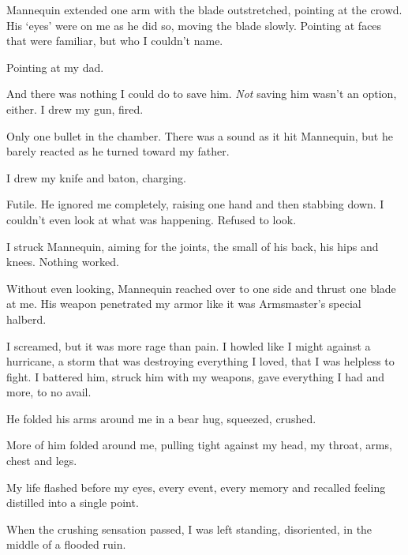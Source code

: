 Mannequin extended one arm with the blade outstretched, pointing at the crowd.  His `eyes' were on me as he did so, moving the blade slowly.  Pointing at faces that were familiar, but who I couldn't name.



Pointing at my dad.



And there was nothing I could do to save him.  \emph{Not} saving him wasn't an option, either.  I drew my gun, fired.



Only one bullet in the chamber.  There was a sound as it hit Mannequin, but he barely reacted as he turned toward my father.



I drew my knife and baton, charging.



Futile.  He ignored me completely, raising one hand and then stabbing down.  I couldn't even look at what was happening.  Refused to look.



I struck Mannequin, aiming for the joints, the small of his back, his hips and knees.  Nothing worked.



Without even looking, Mannequin reached over to one side and thrust one blade at me.  His weapon penetrated my armor like it was Armsmaster's special halberd.



I screamed, but it was more rage than pain.  I howled like I might against a hurricane, a storm that was destroying everything I loved, that I was helpless to fight.  I battered him, struck him with my weapons, gave everything I had and more, to no avail.



He folded his arms around me in a bear hug, squeezed, crushed.



More of him folded around me, pulling tight against my head, my throat, arms, chest and legs.



My life flashed before my eyes, every event, every memory and recalled feeling distilled into a single point.



When the crushing sensation passed, I was left standing, disoriented, in the middle of a flooded ruin.



